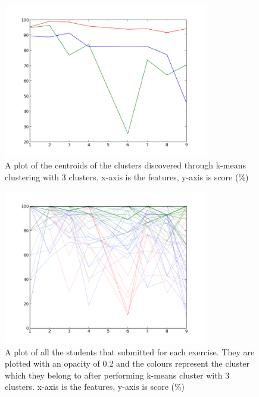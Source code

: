 \begin{figure}[h!]
\centering
\includegraphics[width=0.8\textwidth]{images/kmeans_3_centers.png}
\caption{A plot of the centroids of the clusters discovered through k-means clustering with 3 clusters. x-axis is the features, y-axis is score (\%)}
\label{fig:kmeans_3_centers}
\end{figure}

\begin{figure}[h!]
\centering
\includegraphics[width=0.8\textwidth]{images/kmeans_3.png}
\caption{A plot of all the students that submitted for each exercise. They are plotted with an opacity of 0.2 and the colours represent the cluster which they belong to after performing k-means cluster with 3 clusters. x-axis is the features, y-axis is score (\%)}
\label{fig:kmeans_3}
\end{figure}

